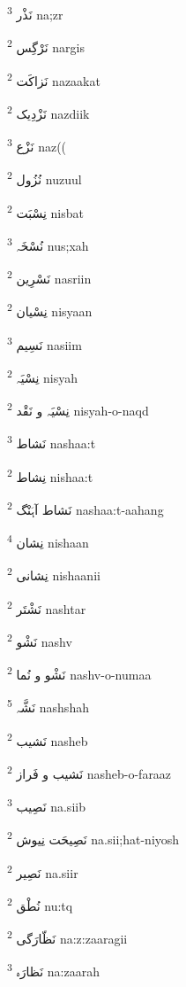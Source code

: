 \documentclass[12pt]{article}
\begin{document}
\begin{multicols}{5}
{\ur نَذْر}   \textsuperscript{3} na;zr

{\ur نَرْگِس}   \textsuperscript{2} nargis

{\ur نَزاکَت}   \textsuperscript{2} nazaakat

{\ur نَزْدِیک}   \textsuperscript{2} nazdiik

{\ur نَزْع}   \textsuperscript{3} naz((

{\ur نُزُول}   \textsuperscript{2} nuzuul

{\ur نِسْبَت}   \textsuperscript{2} nisbat

{\ur نُسْخَہ}   \textsuperscript{3} nus;xah

{\ur نَسْرِین}   \textsuperscript{2} nasriin

{\ur نِسْیان}   \textsuperscript{2} nisyaan

{\ur نَسِیم}   \textsuperscript{3} nasiim

{\ur نِسْیَہ}   \textsuperscript{2} nisyah

{\ur نِسْیَہ و نَقْد}   \textsuperscript{2} nisyah-o-naqd

{\ur نَشاط}   \textsuperscript{3} nashaa:t

{\ur نِشاط}   \textsuperscript{2} nishaa:t

{\ur نَشاط آہَنْگ}   \textsuperscript{2} nashaa:t-aahang

{\ur نِشان}   \textsuperscript{4} nishaan

{\ur نِشانی}   \textsuperscript{2} nishaanii

{\ur نَشْتَر}   \textsuperscript{2} nashtar

{\ur نَشْو}   \textsuperscript{2} nashv

{\ur نَشْو و نُما}   \textsuperscript{2} nashv-o-numaa

{\ur نَشَّہ}   \textsuperscript{5} nashshah

{\ur نَشیب}   \textsuperscript{2} nasheb

{\ur نَشیب و فَراز}   \textsuperscript{2} nasheb-o-faraaz

{\ur نَصِیب}   \textsuperscript{3} na.siib

{\ur نَصِیحَت نِیوش}   \textsuperscript{2} na.sii;hat-niyosh

{\ur نَصِیر}   \textsuperscript{2} na.siir

{\ur نُطْق}   \textsuperscript{2} nu:tq

{\ur نَظّارَگی}   \textsuperscript{2} na:z:zaaragii

{\ur نَظارَہ}   \textsuperscript{3} na:zaarah


\end{multicols}
\end{document}
